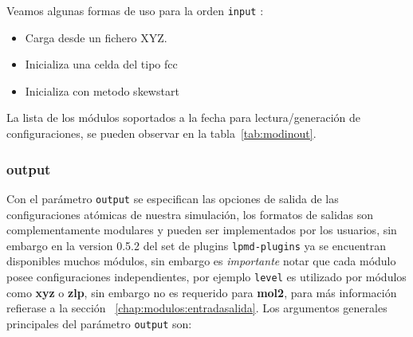 Veamos algunas formas de uso para la orden \verb|input| :

\begin{itemize}
\item Carga desde un fichero XYZ.
\item Inicializa una celda del tipo fcc
\item Inicializa con metodo skewstart
\end{itemize}

La lista de los m\'odulos soportados a la fecha para lectura/generaci\'on de configuraciones, se pueden observar en la tabla~\ref{tab:modinout}.



\subsubsection{output}

Con el par\'ametro \verb|output| se especifican las opciones de salida de las configuraciones at\'omicas de nuestra simulaci\'on, los formatos de salidas son complementamente modulares y pueden ser implementados por los usuarios, sin embargo en la version 0.5.2 del set de plugins \verb|lpmd-plugins| ya se encuentran disponibles muchos m\'odulos, sin embargo es \textit{importante} notar que cada m\'odulo posee configuraciones independientes, por ejemplo \verb|level| es utilizado por m\'odulos como \textbf{xyz} o \textbf{zlp}, sin embargo no es requerido para \textbf{mol2}, para m\'as informaci\'on refierase a la secci\'on ~\ref{chap:modulos:entradasalida}. Los argumentos generales principales del par\'ametro \verb|output| son:


